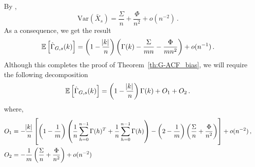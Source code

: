 \documentclass[12pt]{article}
\newcommand{\E}{\mathbb{E}}
\newcommand{\Var}{\text{Var}}
\theoremstyle{remark}
\begin{document}
By \cite[Proposition 1]{song1995optimal},
\[
\Var(\bar{X}_s) = \dfrac{\Sigma}{n} + \dfrac{\Phi}{n^2} + o(n^{-2})\,.
\]
As a consequence, we get the result 
\[
 \E \left[\hat{\Gamma}_{G,s}(k) \right] =  \left(1- \dfrac{\abs{k}}{n}\right)\left( \Gamma(k) - \dfrac{\Sigma}{mn} - \dfrac{\Phi}{mn^2} \right) + o(n^{-1})\,.
\]
Although this completes the proof of Theorem~\ref{th:G-ACF_bias}, we will require the following decomposition
 \begin{equation} \label{eq:G-ACF_expec_breakdown}
     \mathbb{E}\left[\hat{\Gamma}_{G,s}(k)\right] = \left(1- \dfrac{\abs{k}}{n}\right)\Gamma(k) + O_1 + O_2\,.
 \end{equation}
%
where,
\begin{align*}
    O_1 &= -\dfrac{\abs{k}}{n}\left[\left(1-\dfrac{1}{m}\right)\left(\dfrac{1}{n}\sum_{h=0}^{n-1}\Gamma(h)^T + \dfrac{1}{n}\sum_{h=0}^{n-1}\Gamma(h)\right) - \left(2-\dfrac{1}{m}\right) \left(\dfrac{\Sigma}{n} + \dfrac{\Phi}{n^2}\right)\right] + o(n^{-2})\, ,\\
    O_2 &= -\dfrac{1}{m}\left(\dfrac{\Sigma}{n} + \dfrac{\Phi}{n^2}\right) + o(n^{-2})
\end{align*}
%
%
\end{document}
